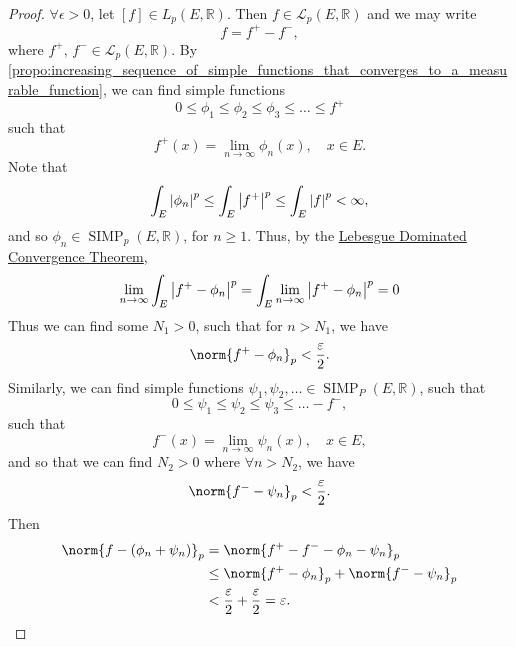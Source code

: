 \documentclass[notoc,notitlepage]{tufte-book}
\DeclareMathOperator{\SIMP}{SIMP}
\begin{document}
\begin{proof}
  \noindent
  $\forall \epsilon > 0$, let $[f] \in L_p(E, \mathbb{R})$.
  Then $f \in \mathcal{L}_p(E, \mathbb{R})$ and we may write
  \begin{equation*}
    f = f^+ - f^-,
  \end{equation*}
  where $f^+,\, f^- \in \mathcal{L}_p(E, \mathbb{R})$.
  By
  \cref{propo:increasing_sequence_of_simple_functions_that_converges_to_a_measurable_function},
  we can find simple functions
  \begin{equation*}
    0 \leq \phi_1 \leq \phi_2 \leq \phi_3 \leq \hdots \leq f^+
  \end{equation*}
  such that
  \begin{equation*}
    f^+(x) = \lim_{n \to \infty} \phi_n(x),\quad x \in E.
  \end{equation*}
  Note that
  \begin{equation*}
    \int_{E} \left|\phi_n\right|^p \leq \int_{E} \left|f^+\right|^p 
      \leq \int_{E} \left|f\right|^p < \infty,
  \end{equation*}
  and so $\phi_n \in \SIMP_p(E, \mathbb{R})$, for $n \geq 1$.
  Thus, by the
  \hyperref[thm:lebesgue_dominated_convergence_theorem]{Lebesgue Dominated
  Convergence Theorem},
  \begin{equation*}
    \lim_{n \to \infty} \int_{E} \left|f^+ - \phi_n\right|^p = \int_{E} \lim_{n \to
    \infty} \left|f^+ - \phi_n\right|^p = 0
  \end{equation*}
  Thus we can find some $N_1 > 0$, such that for $n > N_1$, we have
  \begin{equation*}
    \norm{f^+ - \phi_n}_p < \frac{\epsilon}{2}.
  \end{equation*}
  Similarly, we can find simple functions
  $\psi_1, \psi_2, \ldots \in \SIMP_P(E, \mathbb{R})$, such that
  \begin{equation*}
    0 \leq \psi_1 \leq \psi_2 \leq \psi_3 \leq \hdots - f^-,
  \end{equation*}
  such that
  \begin{equation*}
    f^-(x) = \lim_{n \to \infty} \psi_n(x),\quad x \in E,
  \end{equation*}
  and so that we can find $N_2 > 0$ where $\forall n > N_2$, we have
  \begin{equation*}
    \norm{f^- - \psi_n}_p < \frac{\epsilon}{2}.
  \end{equation*}
  Then
  \begin{align*}
    \norm{f - (\phi_n + \psi_n)}_p
    &= \norm{f^+ - f^- - \phi_n - \psi_n}_p \\
    &\leq \norm{f^+ - \phi_n}_p + \norm{f^- - \psi_n}_p \\
    &< \frac{\epsilon}{2} + \frac{\epsilon}{2} = \epsilon.
  \end{align*}


\end{proof}
\end{document}
